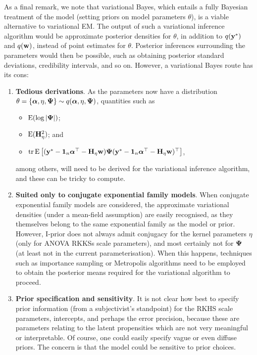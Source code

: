 \documentclass[showframe,11pt,twoside,openright]{report}
\begin{document}
As a final remark, we note that variational Bayes, which entails a fully Bayesian treatment of the model (setting priors on model parameters $\theta$), is a viable alternative to variational EM.
The output of such a variational inference algorithm would be approximate posterior densities for $\theta$, in addition to $q({\mathbf y}^*)$ and $q({\mathbf w})$, instead of point estimates for $\theta$.
Posterior inferences surrounding the parameters would then be possible, such as obtaining posterior standard deviations, credibility intervals, and so on.
However, a variational Bayes route has its cons:
\begin{enumerate}
  \item \textbf{Tedious derivations}. As the parameters now have a distribution $\theta = \{{\bm\alpha},\eta,{\bm\Psi}\} \sim q({\bm\alpha},\eta,{\bm\Psi})$, quantities such as
  \begin{itemize}
    \item $\operatorname{E}(\log \vert {\bm\Psi} \vert)$;
    \item $\operatorname{E}({\mathbf H}_\eta^2)$; and
    \item $\operatorname{tr} \operatorname{E}\big[ ({\mathbf y}^*-{\mathbf 1}_n{\bm\alpha}^\top - {\mathbf H}_\eta{\mathbf w}){\bm\Psi} ({\mathbf y}^*-{\mathbf 1}_n{\bm\alpha}^\top - {\mathbf H}_\eta{\mathbf w})^\top \big]$,
  \end{itemize}
  among others, will need to be derived for the variational inference algorithm, and these can be tricky to compute.
  
  \item \textbf{Suited only to conjugate exponential family models}. When conjugate exponential family models are considered, the approximate variational densities (under a mean-field assumption) are easily recognised, as they themselves belong to the same exponential family as the model or prior. However, I-prior does not always admit conjugacy for the kernel parameters $\eta$ (only for ANOVA RKKSs scale parameters), and most certainly not for ${\bm\Psi}$ (at least not in the current parameterisation). When this happens, techniques such as importance sampling or Metropolis algorithms need to be employed to obtain the posterior means required for the variational algorithm to proceed.
  
  \item \textbf{Prior specification and sensitivity}. It is not clear how best to specify prior information (from a subjectivist's standpoint) for the RKHS scale parameters, intercepts, and perhaps the error precision, because these are parameters relating to the latent propensities which are not very meaningful or interpretable. Of course, one could easily specify vague or even diffuse priors. The concern is that the model could be sensitive to prior choices.
\end{enumerate}
\end{document}
